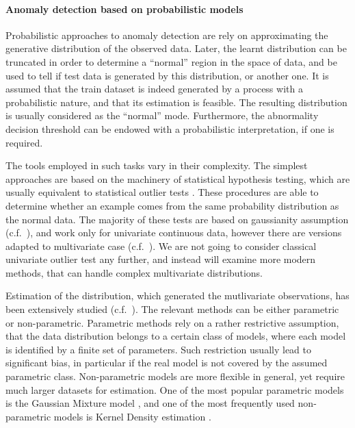 \documentclass[a4paper,14pt]{extarticle}
\begin{document}
\paragraph{Anomaly detection based on probabilistic models} %
\label{par:anomaly_detection_based_on_probabilistic_models}

Probabilistic approaches to anomaly detection are rely on approximating the generative
distribution of the observed data. Later, the learnt distribution can be truncated
in order to determine a ``normal'' region in the space of data, and be used to tell
if test data is generated by this distribution, or another one. It is assumed that
the train dataset is indeed generated by a process with a probabilistic nature, and
that its estimation is feasible. The resulting distribution is usually considered
as the ``normal'' mode. Furthermore, the abnormality decision threshold can be endowed
with a probabilistic interpretation, if one is required.

The tools employed in such tasks vary in their complexity. The simplest approaches
are based on the machinery of statistical hypothesis testing, which are usually equivalent
to statistical outlier tests \cite{vic1994}. These procedures are able to determine
whether an example comes from the same probability distribution as the normal data.
The majority of these tests are based on gaussianity assumption (c.f.~\cite{grubbs1969}),
and work only for univariate continuous data, however there are versions adapted
to multivariate case (c.f.~\cite{aggarwal2008,vic1994}). We are not going to consider
classical univariate outlier test any further, and instead will examine more modern
methods, that can handle complex multivariate distributions.

Estimation of the distribution, which generated the mutlivariate observations, has
been extensively studied (c.f.~\cite{chow1970,scott2008}). The relevant methods can
be either parametric or non-parametric. Parametric methods rely on a rather restrictive
assumption, that the data distribution belongs to a certain class of models, where
each model is identified by a finite set of parameters. Such restriction usually
lead to significant bias, in particular if the real model is not covered by the assumed
parametric class. Non-parametric models are more flexible in general, yet require
much larger datasets for estimation. One of the most popular parametric models is
the Gaussian Mixture model \cite{markou2003,chandola2009,miljkovic2010}, and one
of the most frequently used non-parametric models is Kernel Density estimation
\cite{duda2012,markou2003,chandola2009}.
\end{document}
